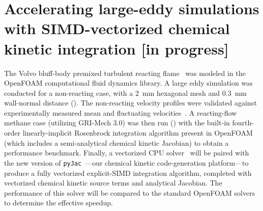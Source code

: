 \documentclass[a4paper,10pt]{article}
\begin{document}
\section{Accelerating large-eddy simulations with SIMD-vectorized chemical kinetic integration [in progress]}
The Volvo bluff-body premixed turbulent reacting flame~\cite{sjunnesson1991validation,sjunnesson1991lda} was modeled in the OpenFOAM computational fluid dynamics library.
A large eddy simulation was conducted for a non-reacting case, with a \SI{2}{\milli\meter} hexagonal mesh and \SI{0.3}{\milli\meter} wall-normal distance ().
The non-reacting velocity profiles were validated against experimentally measured mean and fluctuating velocities~\cite{sjunnesson1991validation,sjunnesson1991lda}.
A reacting-flow methane case (utilizing GRI-Mech 3.0) was then run () with the built-in fourth-order linearly-implicit Rosenbrock integration algorithm present in OpenFOAM (which includes a semi-analytical chemical kinetic Jacobian) to obtain a performance benchmark.
Finally, a vectorized CPU solver~\cite{STONE201818} will be paired with the new version of \texttt{pyJac}~---our chemical kinetic code-generation platform---to produce a fully vectorized explicit-SIMD integration algorithm, completed with vectorized chemical kinetic source terms and analytical Jacobian.
The performance of this solver will be compared to the standard OpenFOAM solvers to determine the effective speedup.
\end{document}
